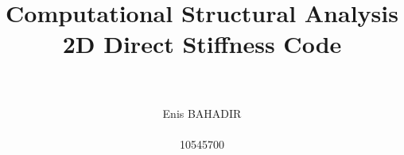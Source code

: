 \documentclass[12pt,a4paper,titlepage]{article}
\begin{document}
%
%
\title{Computational Structural Analysis \\ 2D Direct Stiffness Code}
\author{\\\\Enis BAHADIR \\\\ 10545700}
\maketitle
%
%
\setcounter{page}{1}
%
%
%



%
\end{document}
